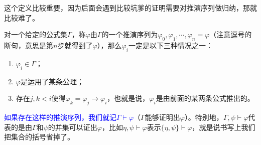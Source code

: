 \documentclass[b5paper,oneside]{ctexbook}
\newcommand{\Blue}[1]{\textcolor[named]{blue}{#1}}
\begin{document}
这个定义比较重要，因为后面会遇到比较坑爹的证明需要对推演序列做归纳，那就比较难了。

对一个给定的公式集$\Gamma$，称$\varphi$由$\Gamma$的一个推演序列为$\varphi_0,\varphi_1,\cdots, \varphi_n=\varphi$（注意逗号的断句，意思是第$n$步就得到了$\varphi$），那么$\varphi_i$一定是以下三种情况之一：
\begin{enumerate}
\item $\varphi_i\in\Gamma$；
\item $\varphi$是运用了某条公理；
\item 存在$j,k<i$使得$\varphi_k=\varphi_j\rightarrow\varphi_i$，也就是说，$\varphi_i$是由前面的某两条公式推出的。
\end{enumerate}

\Blue{如果存在这样的推演序列，我们就记$\Gamma\vdash\varphi$}（$\Gamma$能够证明出$\varphi$）。特别地，$\Gamma,\psi\vdash\varphi$代表的是由$\Gamma$和$\psi$的并集可以证出$\varphi$，比如$\eta,\psi\vdash\varphi$表示$\{\eta,\psi\}\vdash\varphi$，就是说书写上我们把集合的括号省掉了。
\end{document}
